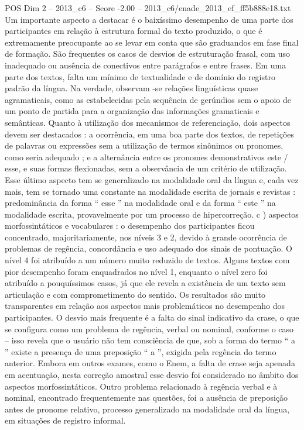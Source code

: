 \begin{textsample}{POS Dim 2 – 2013\_c6 – Score -2.00 – 2013\_c6/enade\_2013\_ef\_ff5b888e18.txt}
Um importante aspecto a destacar é o baixíssimo desempenho de uma parte dos participantes em relação à estrutura formal do texto produzido, o que é extremamente preocupante ao se levar em conta que são graduandos em fase final de formação.
São frequentes os casos de desvios de estruturação frasal, com uso inadequado ou ausência de conectivos entre parágrafos e entre frases.
Em uma parte dos textos, falta um mínimo de textualidade e de domínio do registro padrão da língua.
Na verdade, observam -se relações linguísticas quase agramaticais, como as estabelecidas pela sequência de gerúndios sem o apoio de um ponto de partida para a organização das informações gramaticais e semânticas.
Quanto à utilização dos mecanismos de referenciação, dois aspectos devem ser destacados : a ocorrência, em uma boa parte dos textos, de repetições de palavras ou expressões sem a utilização de termos sinônimos ou pronomes, como seria adequado ; e a alternância entre os pronomes demonstrativos este / esse, e suas formas flexionadas, sem a observância de um critério de utilização.
Esse último aspecto tem se generalizado na modalidade oral da língua e, cada vez mais, tem se tornado uma constante na modalidade escrita de jornais e revistas : predominância da forma “ esse ” na modalidade oral e da forma “ este ” na modalidade escrita, provavelmente por um processo de hipercorreção. c ) aspectos morfossintáticos e vocabulares : o desempenho dos participantes ficou concentrado, majoritariamente, nos níveis 3 e 2, devido à grande ocorrência de problemas de regência, concordância e uso adequado dos sinais de pontuação.
O nível 4 foi atribuído a um número muito reduzido de textos.
Alguns textos com pior desempenho foram enquadrados no nível 1, enquanto o nível zero foi atribuído a pouquíssimos casos, já que ele revela a existência de um texto sem articulação e com comprometimento do sentido.
Os resultados são muito transparentes em relação aos aspectos mais problemáticos no desempenho dos participantes.
O desvio mais frequente é a falta do sinal indicativo da crase, o que se configura como um problema de regência, verbal ou nominal, conforme o caso – isso revela que o usuário não tem consciência de que, sob a forma do termo “ a ” existe a presença de uma preposição “ a ”, exigida pela regência do termo anterior.
Embora em outros exames, como o Enem, a falta de crase seja apenada em acentuação, nesta correção amostral esse desvio foi considerado no âmbito dos aspectos morfossintáticos.
Outro problema relacionado à regência verbal e à nominal, encontrado frequentemente nas questões, foi a ausência de preposição antes de pronome relativo, processo generalizado na modalidade oral da língua, em situações de registro informal.

\end{textsample}
